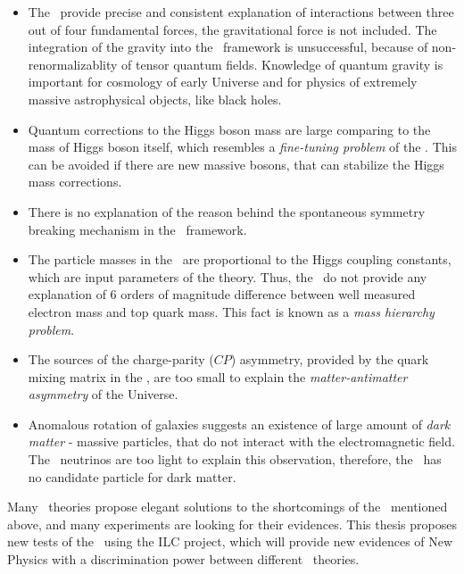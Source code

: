 \begin{itemize}
\item The \sm\ provide precise and consistent explanation of interactions between three out of four fundamental forces, the gravitational force is not included. The integration of the gravity into the \sm\ framework is unsuccessful, because of non-renormalizablity of tensor quantum fields. Knowledge of quantum gravity is important for cosmology of early Universe and for physics of extremely massive astrophysical objects, like black holes.
\item Quantum corrections to the Higgs boson mass are large comparing to the mass of Higgs boson itself, which resembles a \textit{fine-tuning problem} of the \sm. This can be avoided if there are new massive bosons, that can stabilize the Higgs mass corrections.
\item There is no explanation of the reason behind the spontaneous symmetry breaking mechanism in the \sm\ framework. 

\item The particle masses in the \sm\ are proportional to the Higgs coupling constants, which are input parameters of the theory. Thus, the \sm\ do not provide any explanation of 6 orders of magnitude difference between well measured electron mass and top quark mass. This fact is known as a \textit{mass hierarchy problem}.

\item The sources of the charge-parity ($CP$) asymmetry, provided by the quark mixing matrix in the \sm, are too small to explain the \textit{matter-antimatter asymmetry} of the Universe.
\item Anomalous rotation of galaxies suggests an existence of large amount of \textit{dark matter} - massive particles, that do not interact with the electromagnetic field. The \sm\ neutrinos are too light to explain this observation, therefore, the \sm\ has no candidate particle for dark matter. 

\end{itemize}



Many \bsm\ theories propose elegant solutions to the shortcomings of the \sm\ mentioned above, and many experiments are looking for their evidences. 
This thesis proposes new tests of the \sm\ using the ILC project, which will provide new evidences of New Physics with a discrimination power between different \bsm\ theories.



